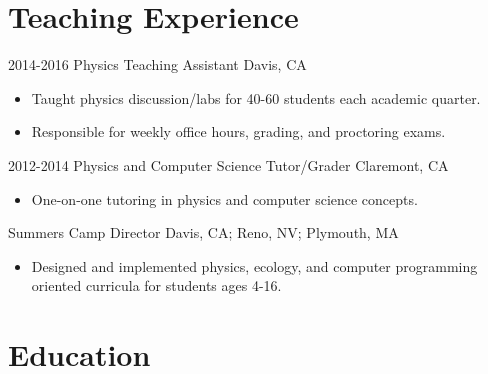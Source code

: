 \documentclass[]{cv-style}          %
\begin{document}

\section{Teaching Experience}
\begin{entrylist}

\entry
  {2014-2016}
  {Physics Teaching Assistant}
  {Davis, CA}
  {
  \begin{itemize}
    \item Taught physics discussion/labs for 40-60 students each academic quarter.
    \item Responsible for weekly office hours, grading, and proctoring exams.\\
  \end{itemize}}
\entry
  {2012-2014}
  {Physics and Computer Science Tutor/Grader}
  {Claremont, CA}
  {
  \begin{itemize}
    \item One-on-one tutoring in physics and computer science concepts.\\
  \end{itemize}}
\entry
  {Summers}
  {Camp Director}
  {Davis, CA; Reno, NV; Plymouth, MA}
  {
  \begin{itemize}
    \item Designed and implemented physics, ecology, and computer programming oriented curricula for students ages 4-16.\\
  \end{itemize}}

\end{entrylist}


\section{Education}
\end{document}
